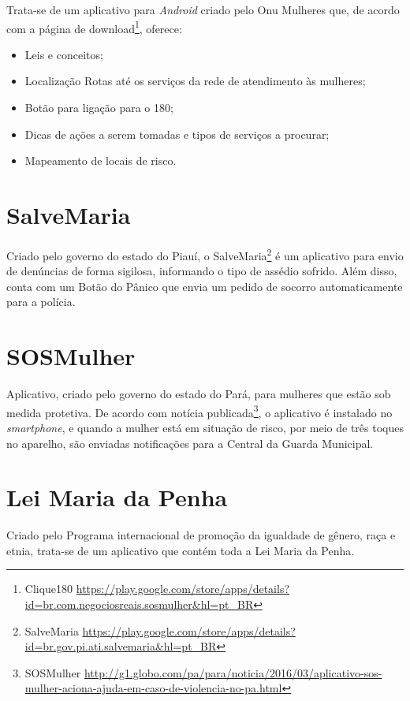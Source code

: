 Trata-se de um aplicativo para \textit{Android} criado pelo Onu Mulheres que, de acordo com
a página de download\footnote{Clique180 \url{https://play.google.com/store/apps/details?id=br.com.negociosreais.sosmulher&hl=pt_BR}}, oferece:

\begin{itemize}
	\item Leis e conceitos;
	\item Localização Rotas até os serviços da rede de atendimento às mulheres;
	\item Botão para ligação para o 180;
	\item Dicas de ações a serem tomadas e tipos de serviços a procurar; 
	\item Mapeamento de locais de risco.
\end{itemize}

\section*{SalveMaria}

Criado pelo governo do estado do Piauí, o SalveMaria\footnote{SalveMaria \url{https://play.google.com/store/apps/details?id=br.gov.pi.ati.salvemaria&hl=pt_BR}} é um aplicativo para envio de denúncias
de forma sigilosa, informando o tipo de assédio sofrido.
Além disso, conta com um Botão do Pânico que envia um pedido de socorro automaticamente para a polícia.

\section*{SOSMulher}

Aplicativo, criado pelo governo do estado do Pará, para mulheres que estão sob medida protetiva. 
De acordo com notícia publicada\footnote{SOSMulher \url{http://g1.globo.com/pa/para/noticia/2016/03/aplicativo-sos-mulher-aciona-ajuda-em-caso-de-violencia-no-pa.html}}, o aplicativo é instalado no \textit{smartphone}, e quando a mulher está em situação de risco, por meio de três toques no aparelho, são enviadas notificações para a Central da Guarda Municipal.

\section*{Lei Maria da Penha}

Criado pelo Programa internacional de promoção da igualdade de gênero, raça e etnia, trata-se de um
aplicativo que contém toda a Lei Maria da Penha.

